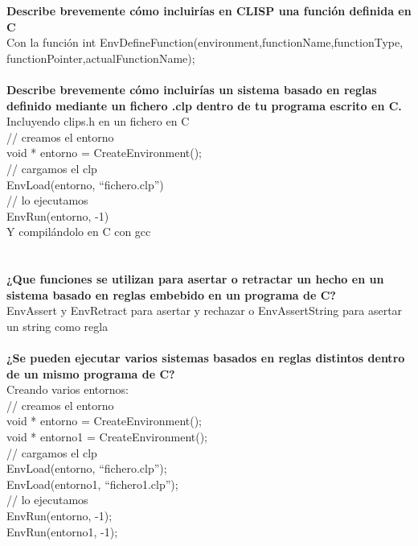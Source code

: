 \documentclass{article}
\begin{document}
\textbf{Describe brevemente cómo incluirías en CLISP una función definida en C}\\
Con la función int EnvDefineFunction(environment,functionName,functionType,\\functionPointer,actualFunctionName);
\\\\
\textbf{Describe brevemente cómo incluirías un sistema basado en reglas definido mediante un fichero .clp dentro de tu programa escrito en C.}\\
Incluyendo clips.h en un fichero en C\\
// creamos el entorno\\
void * entorno = CreateEnvironment();\\
// cargamos el clp\\
EnvLoad(entorno, “fichero.clp”)\\
// lo ejecutamos\\
EnvRun(entorno, -1)\\
Y compilándolo en C con gcc\\
\\\\
\textbf{¿Que funciones se utilizan para asertar o retractar un hecho en un sistema basado en reglas embebido en un programa de C?}\\
 EnvAssert y EnvRetract para asertar y rechazar o EnvAssertString para asertar un string como regla
\\\\
\textbf{¿Se pueden ejecutar varios sistemas basados en reglas distintos dentro de un mismo programa de C?}\\
Creando varios entornos:\\
// creamos el entorno\\
void * entorno = CreateEnvironment();\\
void * entorno1 = CreateEnvironment();\\
// cargamos el clp\\
EnvLoad(entorno, “fichero.clp”);\\
EnvLoad(entorno1, “fichero1.clp”);\\
// lo ejecutamos\\
EnvRun(entorno, -1);\\
EnvRun(entorno1, -1);\\
\end{document}
